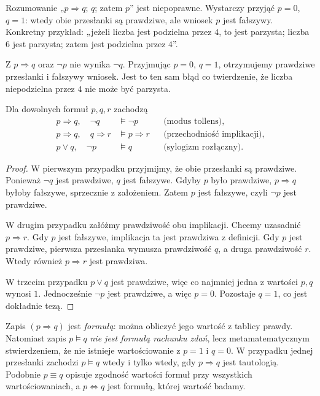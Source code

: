 \begin{przyklad}
Rozumowanie „$p\Rightarrow q$; $q$; zatem $p$” jest
niepoprawne. Wystarczy przyjąć $p=0$, $q=1$:
wtedy obie przesłanki są prawdziwe, ale wniosek
$p$ jest fałszywy. Konkretny przykład: „jeżeli
liczba jest podzielna przez $4$, to jest parzysta;
liczba $6$ jest parzysta; zatem jest podzielna przez $4$”.
\end{przyklad}

\begin{przyklad}
Z $p\Rightarrow q$ oraz $\neg p$ nie wynika $\neg q$.
Przyjmując $p=0$, $q=1$, otrzymujemy prawdziwe
przesłanki i fałszywy wniosek. Jest to ten sam
błąd co twierdzenie, że liczba niepodzielna przez $4$
nie może być parzysta.
\end{przyklad}

\begin{twierdzenie}
\label{thm:valid-arguments}
Dla dowolnych formuł $p,q,r$ zachodzą
\begin{align*}
p\Rightarrow q,\quad\neg q&\models\neg p&&\text{(modus tollens)},\\
p\Rightarrow q,\quad q\Rightarrow r&\models p\Rightarrow r
   &&\text{(przechodniość implikacji)},\\
p\lor q,\quad\neg p&\models q&&\text{(sylogizm rozłączny)}.
\end{align*}
\end{twierdzenie}
\begin{proof}
W pierwszym przypadku przyjmijmy, że obie przesłanki
są prawdziwe. Ponieważ $\neg q$ jest prawdziwe,
$q$ jest fałszywe. Gdyby $p$ było prawdziwe,
$p\Rightarrow q$ byłoby fałszywe, sprzecznie z
założeniem. Zatem $p$ jest fałszywe, czyli
$\neg p$ jest prawdziwe.

W drugim przypadku załóżmy prawdziwość obu implikacji.
Chcemy uzasadnić $p\Rightarrow r$. Gdy $p$ jest
fałszywe, implikacja ta jest prawdziwa z definicji.
Gdy $p$ jest prawdziwe, pierwsza przesłanka wymusza
prawdziwość $q$, a druga prawdziwość $r$.
Wtedy również $p\Rightarrow r$ jest prawdziwa.

W trzecim przypadku $p\lor q$ jest prawdziwe, więc
co najmniej jedna z wartości $p,q$ wynosi $1$.
Jednocześnie $\neg p$ jest prawdziwe, a więc $p=0$.
Pozostaje $q=1$, co jest dokładnie tezą.
\end{proof}

\begin{przyklad}
Zapis $(p\Rightarrow q)$ jest \emph{formułą}: można obliczyć
jego wartość z tablicy prawdy. Natomiast zapis
$p\models q$ \emph{nie jest formułą rachunku zdań}, lecz
metamatematycznym stwierdzeniem, że nie istnieje wartościowanie
z $p=1$ i $q=0$. W przypadku jednej przesłanki zachodzi
$p\models q$ wtedy i tylko wtedy, gdy $p\Rightarrow q$ jest
tautologią. Podobnie $p\equiv q$ opisuje zgodność wartości
formuł przy wszystkich wartościowaniach, a
$p\Leftrightarrow q$ jest formułą, której wartość badamy.
\end{przyklad}

